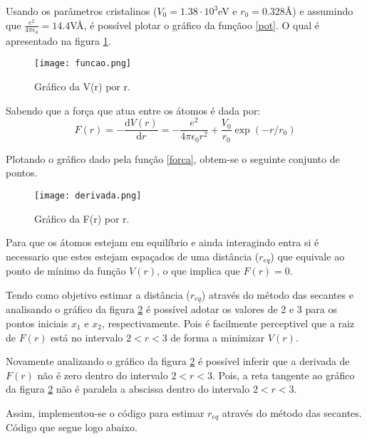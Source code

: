 \documentclass[a4paper,11pt, twoside]{article}
\begin{document}
	Usando os parâmetros cristalinos ($V_0 = 1.38\cdot10^3$eV e $r_0 = 0.328$\AA) e assumindo
	que $\frac{e^2}{4\pi\epsilon_0} = 14.4$V\AA, é possível plotar o gráfico da funçãoo \eqref{pot}.
	O qual é apresentado na figura \ref{graf-pot}.
	\begin{figure}[!ht]
        \begin{center}
            \texttt{[image: funcao.png]}
        \end{center}
        \caption{Gráfico da V(r) por r.\label{graf-pot}}
    \end{figure}
    
    Sabendo que a força que atua entre os átomos é dada por:
    \begin{equation}\label{forca}
        F(r) = -\frac{\mathrm{d}V(r)}{\mathrm{d}r} = -\frac{e^2}{4\pi\epsilon_0 r^2} + \frac{V_0}{r_0}\exp{(-r / r_0)}
    \end{equation}
    
    Plotando o gráfico dado pela função \eqref{forca}, obtem-se o seguinte conjunto de pontos.
	\begin{figure}[!ht]
        \begin{center}
            \texttt{[image: derivada.png]}
        \end{center}
        \caption{Gráfico da F(r) por r.\label{graf-forca}}
    \end{figure}
    
    Para que os átomos estejam em equilíbrio e ainda interagindo entra si é necessario que estes estejam espaçados
    de uma distância ($r_{eq}$) que equivale ao ponto de mínimo da função $V(r)$,
    o que implica que $F(r) = 0$.
    
    Tendo como objetivo estimar a distância ($r_{eq}$) através do método das secantes e analisando o
    gráfico da figura \ref{graf-forca} é possível adotar os valores de 2 e 3 para os pontos iniciais $x_1$ e $x_2$, respectivamente.
    Pois é facilmente perceptivel que a raiz de $F(r)$ está no intervalo $2<r<3$ de forma a minimizar $V(r)$.
    
    Novamente analizando o gráfico da figura \ref{graf-forca} é possível inferir que a derivada de $F(r)$ não é zero dentro do intervalo
    $2<r<3$. Pois, a reta tangente ao gráfico da figura \ref{graf-forca} não é paralela a abscissa dentro do intervalo  $2<r<3$.
	
	Assim, implementou-se o código para estimar $r_{eq}$ através do método das secantes.
	Código que segue logo abaixo.
	
\end{document}
